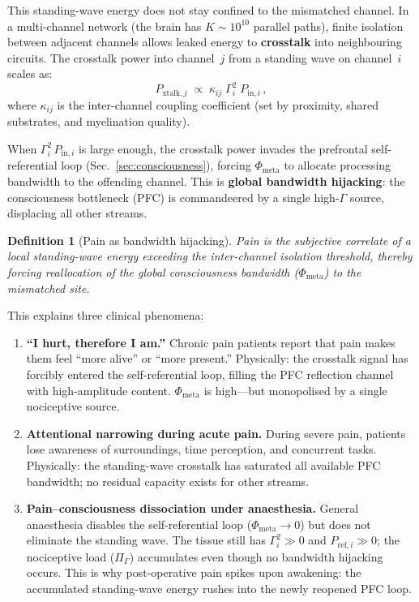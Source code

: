 \documentclass[aps,pre,twocolumn,superscriptaddress,floatfix]{revtex4-2}
\newtheorem{definition}{Definition}
\begin{document}
This standing-wave energy does not stay confined to the
mismatched channel.
In a multi-channel network (the brain has
$K \sim 10^{10}$ parallel paths), finite isolation
between adjacent channels allows leaked energy to
\textbf{crosstalk} into neighbouring circuits.
The crosstalk power into channel~$j$ from a standing
wave on channel~$i$ scales as:
\begin{equation}
  P_{\text{xtalk},j}
  \;\propto\;
  \kappa_{ij}\;\Gamma_i^2\;P_{\text{in},i}\,,
  \label{eq:crosstalk}
\end{equation}
where $\kappa_{ij}$ is the inter-channel coupling
coefficient (set by proximity, shared substrates,
and myelination quality).

When $\Gamma_i^2\,P_{\text{in},i}$ is large enough,
the crosstalk power invades the prefrontal
self-referential loop
(Sec.~\ref{sec:consciousness}), forcing
$\Phi_{\text{meta}}$ to allocate processing bandwidth
to the offending channel.
This is \textbf{global bandwidth hijacking}:
the consciousness bottleneck (PFC) is commandeered
by a single high-$\Gamma$ source, displacing all
other streams.

\begin{definition}[Pain as bandwidth hijacking]
\label{def:pain-hijack}
Pain is the subjective correlate of a local
standing-wave energy exceeding the inter-channel
isolation threshold, thereby forcing reallocation of
the global consciousness bandwidth
($\Phi_{\text{meta}}$) to the mismatched site.
\end{definition}

This explains three clinical phenomena:

\begin{enumerate}
  \item \textbf{``I hurt, therefore I am.''}
    Chronic pain patients report that pain makes
    them feel ``more alive'' or ``more present.''
    Physically: the crosstalk signal
    has forcibly entered the self-referential loop,
    filling the PFC reflection channel with
    high-amplitude content.
    $\Phi_{\text{meta}}$ is high---but monopolised by
    a single nociceptive source.

  \item \textbf{Attentional narrowing during acute pain.}
    During severe pain, patients lose awareness of
    surroundings, time perception, and concurrent
    tasks.
    Physically: the standing-wave crosstalk has
    saturated all available PFC bandwidth;
    no residual capacity exists for other streams.

  \item \textbf{Pain--consciousness dissociation under
    anaesthesia.}
    General anaesthesia disables the self-referential
    loop ($\Phi_{\text{meta}}\to 0$) but does not
    eliminate the standing wave.
    The tissue still has $\Gamma_i^2 \gg 0$
    and $P_{\text{ref},i} \gg 0$;
    the nociceptive load ($\Pi_\Gamma$) accumulates
    even though no bandwidth hijacking occurs.
    This is why post-operative pain spikes upon
    awakening: the accumulated standing-wave energy
    rushes into the newly reopened PFC loop.
\end{enumerate}
\end{document}
